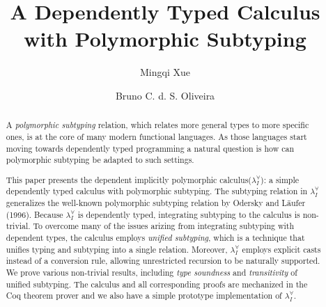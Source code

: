 \documentclass{llncs}
\newcommand{\system}[0]{the dependent implicitly polymorphic calculus\xspace}
\newcommand{\name}[0]{$\lambda_{I}^{\forall}$\xspace}
\begin{document}
\title{A Dependently Typed Calculus with Polymorphic Subtyping}

\author{Mingqi Xue \and Bruno C. d. S. Oliveira}

\maketitle

\begin{abstract}
  A \emph{polymorphic subtyping} relation, which relates more general types
  to more specific ones, is at the core of many modern functional languages.
  As those languages start moving towards dependently typed programming a
  natural question is how can polymorphic subtyping be adapted to such settings.

  This paper presents \system (\name): a simple dependently typed calculus
  with polymorphic subtyping. The subtyping relation in \name
  generalizes the well-known polymorphic subtyping relation by
  Odersky and L\"aufer (1996). Because \name is dependently typed,
  integrating subtyping to the calculus is non-trivial. To overcome
  many of the issues arizing from integrating subtyping with dependent
  types, the calculus employs \emph{unified subtyping}, which is a technique
  that unifies typing and subtyping into a single relation. Moreover, \name
  employs explicit casts instead of a conversion rule, allowing
  unrestricted recursion to be naturally supported.
  We prove various non-trivial results, including \emph{type soundness} and \emph{transitivity}
  of unified subtyping. The calculus and all corresponding proofs
  are mechanized in the Coq theorem prover and we also have a simple prototype
  implementation of \name.
\end{abstract}






\end{document}
